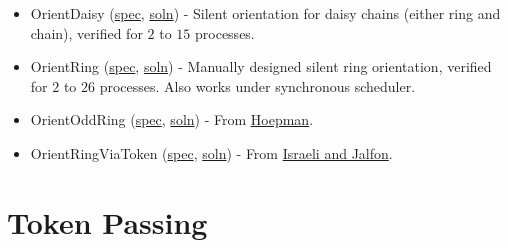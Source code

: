 \begin{itemize}
\item OrientDaisy (\href{examplespec/OrientDaisy.prot}{spec}, \href{examplesoln/OrientDaisy.prot}{soln})
- Silent orientation for daisy chains (either ring and chain), verified for $2$ to $15$ processes.
\item OrientRing (\href{examplespec/OrientRing.prot}{spec}, \href{examplespec/OrientRing.prot}{soln})
- Manually designed silent ring orientation, verified for $2$ to $26$ processes.
Also works under synchronous scheduler.
\item OrientOddRing (\href{examplespec/OrientOddRing.prot}{spec}, \href{examplesoln/OrientOddRing.prot}{soln})
- From \href{http://dx.doi.org/10.1007/BFb0020439}{Hoepman}.
\item OrientRingViaToken (\href{examplespec/OrientRingViaToken.prot}{spec}, \href{examplesoln/OrientRingViaToken.prot}{soln})
- From \href{http://dx.doi.org/10.1006/inco.1993.1029}{Israeli and Jalfon}.
\end{itemize}

\section{Token Passing}

